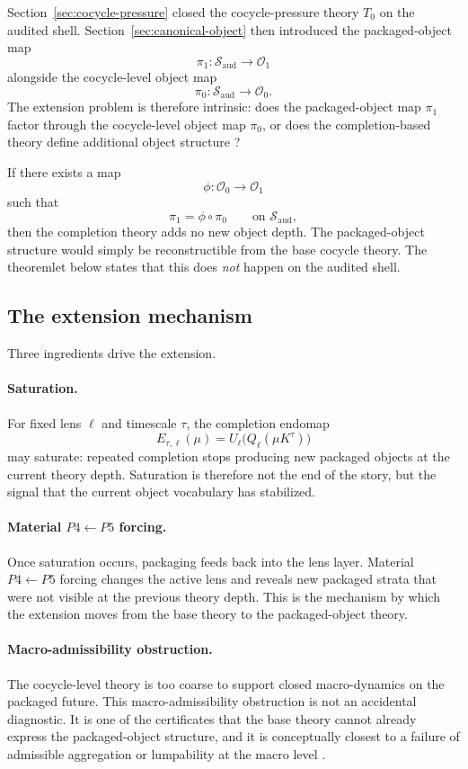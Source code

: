 \documentclass[11pt]{article}
\theoremstyle{definition}
\newcommand{\Tzero}{T_0}
\begin{document}
Section~\ref{sec:cocycle-pressure} closed the cocycle-pressure theory \(\Tzero\) on the audited shell. Section~\ref{sec:canonical-object} then introduced the packaged-object map
\[
\pi_1:\mathcal{S}_{\mathrm{aud}}\to \mathcal{O}_1
\]
alongside the cocycle-level object map
\[
\pi_0:\mathcal{S}_{\mathrm{aud}}\to \mathcal{O}_0.
\]
The extension problem is therefore intrinsic: does the packaged-object map \(\pi_1\) factor through the cocycle-level object map \(\pi_0\), or does the completion-based theory define additional object structure \cite{LindMarcus1995SymbolicDynamics,Walters1986RelativePressure}?

If there exists a map
\[
\phi:\mathcal{O}_0\to\mathcal{O}_1
\]
such that
\[
\pi_1=\phi\circ \pi_0
\qquad \text{on } \mathcal{S}_{\mathrm{aud}},
\]
then the completion theory adds no new object depth. The packaged-object structure would simply be reconstructible from the base cocycle theory. The theoremlet below states that this does \emph{not} happen on the audited shell.

\subsection{The extension mechanism}

Three ingredients drive the extension.

\paragraph{Saturation.}
For fixed lens \(\ell\) and timescale \(\tau\), the completion endomap
\[
E_{\tau,\ell}(\mu)=U_{\ell}\!\bigl(Q_{\ell}(\mu K^\tau)\bigr)
\]
may saturate: repeated completion stops producing new packaged objects at the current theory depth. Saturation is therefore not the end of the story, but the signal that the current object vocabulary has stabilized.

\paragraph{Material \texorpdfstring{$P4\leftarrow P5$}{P4<-P5} forcing.}
Once saturation occurs, packaging feeds back into the lens layer. Material \(P4\leftarrow P5\) forcing changes the active lens and reveals new packaged strata that were not visible at the previous theory depth. This is the mechanism by which the extension moves from the base theory to the packaged-object theory.

\paragraph{Macro-admissibility obstruction.}
The cocycle-level theory is too coarse to support closed macro-dynamics on the packaged future. This macro-admissibility obstruction is not an accidental diagnostic. It is one of the certificates that the base theory cannot already express the packaged-object structure, and it is conceptually closest to a failure of admissible aggregation or lumpability at the macro level \cite{KemenySnell1976FiniteMarkovChains}.
\end{document}
